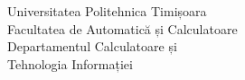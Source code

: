 \begin{titlepage}
    \begin{center}
        \begin{minipage}{0.3\textwidth}
        \end{minipage}%
        \begin{minipage}{0.4\textwidth}
            \centering
            \scriptsize
            Universitatea Politehnica Timișoara\\
            Facultatea de Automatică și Calculatoare\\
            Departamentul Calculatoare și \\Tehnologia Informației
        \end{minipage}%
        \begin{minipage}{0.3\textwidth}
            \begin{flushright}
            \end{flushright}
        \end{minipage}
    \end{center}
    

\end{titlepage}
